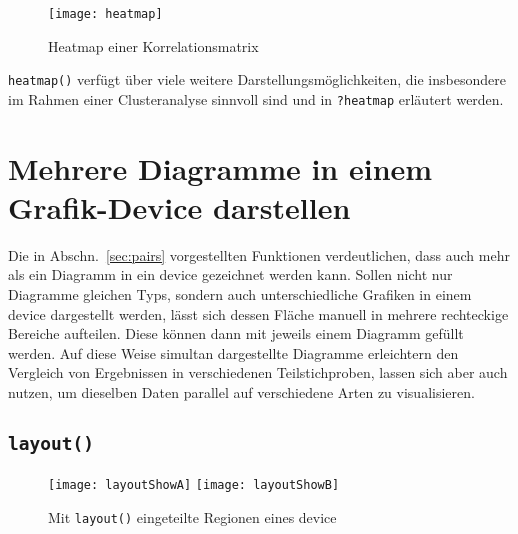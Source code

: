 \begin{figure}[ht]
\centering
\texttt{[image: heatmap]}
\vspace*{-1em}
\caption{Heatmap einer Korrelationsmatrix}
\label{fig:heatmap}
\end{figure}

\lstinline!heatmap()! verfügt über viele weitere Darstellungsmöglichkeiten, die insbesondere im Rahmen einer Clusteranalyse sinnvoll sind und in \lstinline!?heatmap! erläutert werden.

\section{Mehrere Diagramme in einem Grafik-Device darstellen}
\label{sec:diagSplit}

Die in Abschn.\ \ref{sec:pairs} vorgestellten Funktionen verdeutlichen, dass auch mehr als ein Diagramm in ein device gezeichnet werden kann. Sollen nicht nur Diagramme gleichen Typs, sondern auch unterschiedliche Grafiken in einem device dargestellt werden, lässt sich dessen Fläche manuell in mehrere rechteckige Bereiche aufteilen. Diese können dann mit jeweils einem Diagramm gefüllt werden. Auf diese Weise simultan dargestellte Diagramme erleichtern den Vergleich von Ergebnissen in verschiedenen Teilstichproben, lassen sich aber auch nutzen, um dieselben Daten parallel auf verschiedene Arten zu visualisieren.

\subsection{\texttt{layout()}}

\begin{figure}[ht]
\centering
\texttt{[image: layoutShowA]}
\texttt{[image: layoutShowB]}
\vspace*{-0.5em}
\caption{Mit \lstinline!layout()! eingeteilte Regionen eines device
\label{fig:layoutShow}}
\end{figure}

